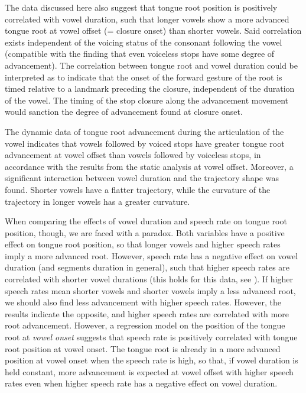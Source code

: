 \documentclass[12pt,]{article}
\begin{document}
The data discussed here also suggest that tongue root position is
positively correlated with vowel duration, such that longer vowels show
a more advanced tongue root at vowel offset (= closure onset) than
shorter vowels. Said correlation exists independent of the voicing
status of the consonant following the vowel (compatible with the finding
that even voiceless stops have some degree of advancement). The
correlation between tongue root and vowel duration could be interpreted
as to indicate that the onset of the forward gesture of the root is
timed relative to a landmark preceding the closure, independent of the
duration of the vowel. The timing of the stop closure along the
advancement movement would sanction the degree of advancement found at
closure onset.

The dynamic data of tongue root advancement during the articulation of
the vowel indicates that vowels followed by voiced stops have greater
tongue root advancement at vowel offset than vowels followed by
voiceless stops, in accordance with the results from the static analysis
at vowel offset. Moreover, a significant interaction between vowel
duration and the trajectory shape was found. Shorter vowels have a
flatter trajectory, while the curvature of the trajectory in longer
vowels has a greater curvature.

When comparing the effects of vowel duration and speech rate on tongue
root position, though, we are faced with a paradox. Both variables have
a positive effect on tongue root position, so that longer vowels and
higher speech rates imply a more advanced root. However, speech rate has
a negative effect on vowel duration (and segments duration in general),
such that higher speech rates are correlated with shorter vowel
durations (this holds for this data, see \citealt{coretta2018j}). If
higher speech rates mean shorter vowels and shorter vowels imply a less
advanced root, we should also find less advancement with higher speech
rates. However, the results indicate the opposite, and higher speech
rates are correlated with more root advancement. However, a regression
model on the position of the tongue root at \emph{vowel onset} suggests
that speech rate is positively correlated with tongue root position at
vowel onset. The tongue root is already in a more advanced position at
vowel onset when the speech rate is high, so that, if vowel duration is
held constant, more advancement is expected at vowel offset with higher
speech rates even when higher speech rate has a negative effect on vowel
duration.
\end{document}
